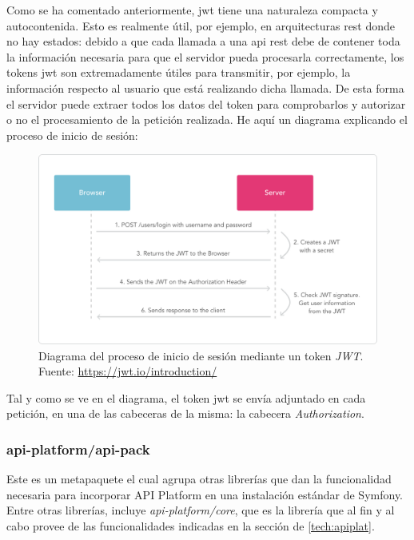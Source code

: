 Como se ha comentado anteriormente, \gls{jwt} tiene una naturaleza compacta y
autocontenida. Esto es realmente útil, por ejemplo, en arquitecturas \gls{rest}
donde no hay estados: debido a que cada llamada a una \gls{api} \gls{rest} debe
de contener toda la información necesaria para que el servidor pueda procesarla
correctamente, los tokens \gls{jwt} son extremadamente útiles para transmitir,
por ejemplo, la información respecto al usuario que está realizando dicha
llamada. De esta forma el servidor puede extraer todos los datos del token para
comprobarlos y autorizar o no el procesamiento de la petición realizada. He
aquí un diagrama explicando el proceso de inicio de sesión:

\begin{figure}[h]
    \center
    \includegraphics[scale=0.3]{img/jwt-diagram}
    \caption{Diagrama del proceso de inicio de sesión mediante un token
      \textit{JWT}. Fuente:
        \url{https://jwt.io/introduction/}}
\end{figure}

Tal y como se ve en el diagrama, el token \gls{jwt} se envía adjuntado en cada
petición, en una de las cabeceras de la misma: la cabecera
\textit{Authorization}.

\subsubsection{api-platform/api-pack}
Este es un metapaquete el cual agrupa otras librerías que dan la funcionalidad
necesaria para incorporar API Platform en una instalación estándar de Symfony.
Entre otras librerías, incluye \textit{api-platform/core}, que es la librería
que al fin y al cabo provee de las funcionalidades indicadas en la sección de
 \ref{tech:apiplat}.
